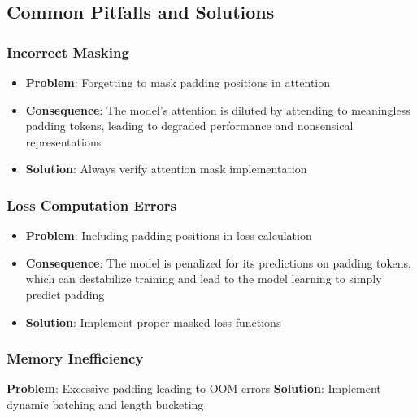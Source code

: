 \subsection{Common Pitfalls and Solutions}

\subsubsection{Incorrect Masking}
\begin{itemize}
\item \textbf{Problem}: Forgetting to mask padding positions in attention
\item \textbf{Consequence}: The model's attention is diluted by attending to meaningless padding tokens, leading to degraded performance and nonsensical representations
\item \textbf{Solution}: Always verify attention mask implementation
\end{itemize}

\subsubsection{Loss Computation Errors}
\begin{itemize}
\item \textbf{Problem}: Including padding positions in loss calculation
\item \textbf{Consequence}: The model is penalized for its predictions on padding tokens, which can destabilize training and lead to the model learning to simply predict padding
\item \textbf{Solution}: Implement proper masked loss functions
\end{itemize}

\subsubsection{Memory Inefficiency}
\textbf{Problem}: Excessive padding leading to OOM errors
\textbf{Solution}: Implement dynamic batching and length bucketing

